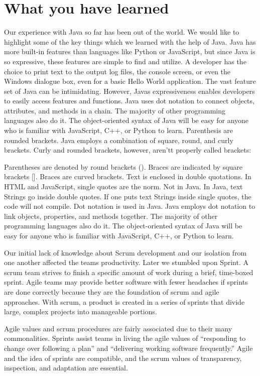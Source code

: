 \section{What you have learned}
\label{what-you-have-learned}
Our experience with Java so far has been out of the world. We would like to highlight some of the key things which we learned with the help of Java. Java has more built-in features than languages like Python or JavaScript, but since Java is so expressive, these features are simple to find and utilize. A developer has the choice to print text to the output log files, the console screen, or even the Windows dialogue box, even for a basic Hello World application. The vast feature set of Java can be intimidating. However, Java\textquotesingle s expressiveness enables developers to easily access features and functions. Java uses dot notation to connect objects, attributes, and methods in a chain. The majority of other programming languages also do it. The object-oriented syntax of Java will be easy for anyone who is familiar with JavaScript, C++, or Python to learn. Parenthesis are rounded brackets.
Java employs a combination of square, round, and curly brackets. Curly and rounded brackets, however, aren't\textquotesingle t properly called brackets:

Parentheses are denoted by round brackets ().
Braces are indicated by square brackets {[}{]}.
Braces are curved brackets.
Text is enclosed in double quotations.
In HTML and JavaScript, single quotes are the norm. Not in Java. In Java, text Strings go inside double quotes. If one puts text Strings inside single quotes, the code will not compile. Dot notation is used in Java. Java employs dot notation to link objects, properties, and methods together. The majority of other programming languages also do it. The object-oriented syntax of Java will be easy for anyone who is familiar with JavaScript, C++, or Python to learn.

Our initial lack of knowledge about Scrum development and our isolation from one another affected the team\textquotesingle s productivity. Later we stumbled upon Sprint. A scrum team strives to finish a specific amount of work during a brief, time-boxed sprint. Agile teams may provide better software with fewer headaches if sprints are done correctly because they are the foundation of scrum and agile approaches. With scrum, a product is created in a series of sprints that divide large, complex projects into manageable portions.

Agile values and scrum procedures are fairly associated due to their many commonalities. Sprints assist teams in living the agile values of “responding to change over following a plan” and “delivering working software frequently.'' Agile and the idea of sprints are compatible, and the scrum values of transparency, inspection, and adaptation are essential.


